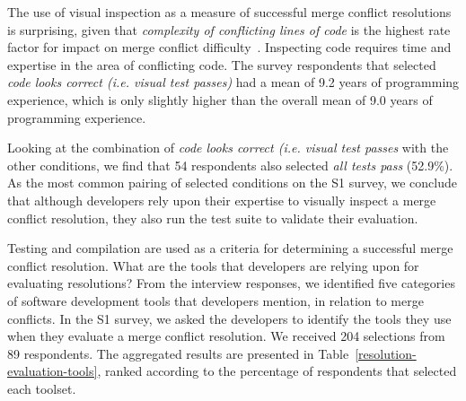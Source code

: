 The use of visual inspection as a measure of successful merge conflict resolutions is surprising, given that \textit{complexity of conflicting lines of code} is the highest rate factor for impact on merge conflict difficulty~\cite{mckee2017software}.
Inspecting code requires time and expertise in the area of conflicting code.
The survey respondents that selected \textit{code looks correct (i.e. visual test passes)} had a mean of 9.2 years of programming experience, which is only slightly higher than the overall mean of 9.0 years of programming experience.

Looking at the combination of \textit{code looks correct (i.e. visual test passes} with the other conditions, we find that 54 respondents also selected \textit{all tests pass} (52.9\%).
As the most common pairing of selected conditions on the S1 survey, we conclude that although developers rely upon their expertise to visually inspect a merge conflict resolution, they also run the test suite to validate their evaluation.


Testing and compilation are used as a criteria for determining a successful merge conflict resolution.
What are the tools that developers are relying upon for evaluating resolutions?
From the interview responses, we identified five categories of software development tools that developers mention, in relation to merge conflicts.
In the S1 survey, we asked the developers to identify the tools they use when they evaluate a merge conflict resolution.
We received 204 selections from 89 respondents.
The aggregated results are presented in Table~\ref{resolution-evaluation-tools}, ranked according to the percentage of respondents that selected each toolset.

